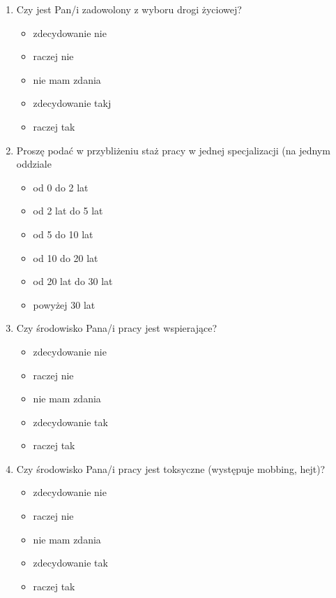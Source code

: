 \documentclass[a4paper,12pt,twoside,openright]{mwrep}
\begin{document}
\begin{appendices}
\begin{enumerate}[label=\arabic*)]
		\item{Czy jest Pan/i zadowolony z wyboru drogi życiowej?}
		\begin{itemize}
			\item{zdecydowanie nie}
			\item{raczej nie}
			\item{nie mam zdania}
			\item{zdecydowanie takj}
			\item{raczej tak}
		\end{itemize}
		\vspace{\baselineskip} 
		
		\item{Proszę podać w przybliżeniu staż pracy w jednej specjalizacji (na jednym oddziale}
		\begin{itemize}
			\item{od 0 do 2 lat}
			\item{od 2 lat do 5 lat}
			\item{od 5 do 10 lat}
			\item{od 10 do 20 lat}
			\item{od 20 lat do 30 lat}
			\item{powyżej 30 lat}
		\end{itemize}
		\vspace{\baselineskip} 
		
		
		\item{Czy środowisko Pana/i pracy jest wspierające?}
		\begin{itemize}
			\item{zdecydowanie nie}
			\item{raczej nie}
			\item{nie mam zdania}
			\item{zdecydowanie tak}
			\item{raczej tak}
		\end{itemize}
		\vspace{\baselineskip} 
		
		\item{Czy środowisko Pana/i pracy jest toksyczne (występuje mobbing, hejt)?}
		\begin{itemize}
			\item{zdecydowanie nie}
			\item{raczej nie}
			\item{nie mam zdania}
			\item{zdecydowanie tak}
			\item{raczej tak}
		\end{itemize}
		\vspace{\baselineskip} 
		

\end{enumerate}
\end{appendices}
\end{document}
